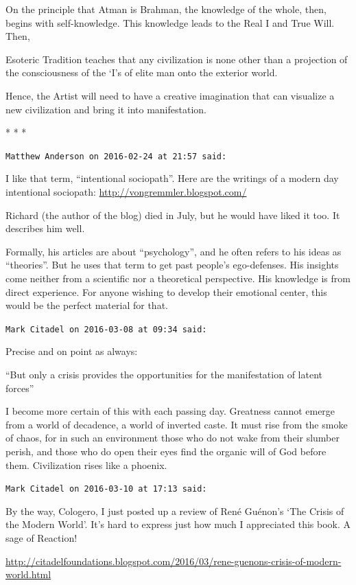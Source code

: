 On the principle that Atman is Brahman, the knowledge of the whole, then, begins with self-knowledge. This knowledge leads to the Real I and True Will. Then,

\begin{quotex}
Esoteric Tradition teaches that any civilization is none other than a projection of the consciousness of the `I's of elite man onto the exterior world.
\end{quotex}


Hence, the Artist will need to have a creative imagination that can visualize a new civilization and bring it into manifestation.



\begin{center}* * *\end{center}

\begin{footnotesize}
\begin{sffamily}
\texttt{Matthew Anderson on 2016-02-24 at 21:57 said:}

I like that term, ``intentional sociopath''. Here are the writings of a modern day intentional sociopath: \url{http://vongremmler.blogspot.com/}

Richard (the author of the blog) died in July, but he would have liked it too. It describes him well.

Formally, his articles are about ``psychology'', and he often refers to his ideas as ``theories''. But he uses that term to get past people's ego-defenses. His insights come neither from a scientific nor a theoretical perspective. His knowledge is from direct experience. For anyone wishing to develop their emotional center, this would be the perfect material for that.

\hfill

\texttt{Mark Citadel on 2016-03-08 at 09:34 said:}

Precise and on point as always:

``But only a crisis provides the opportunities for the manifestation of latent forces''

I become more certain of this with each passing day. Greatness cannot emerge from a world of decadence, a world of inverted caste. It must rise from the smoke of chaos, for in such an environment those who do not wake from their slumber perish, and those who do open their eyes find the organic will of God before them. Civilization rises like a phoenix.

\hfill

\texttt{Mark Citadel on 2016-03-10 at 17:13 said:}

By the way, Cologero, I just posted up a review of René Guénon's `The Crisis of the Modern World'. It's hard to express just how much I appreciated this book. A sage of Reaction!

\url{http://citadelfoundations.blogspot.com/2016/03/rene-guenons-crisis-of-modern-world.html}


\end{sffamily}
\end{footnotesize}

